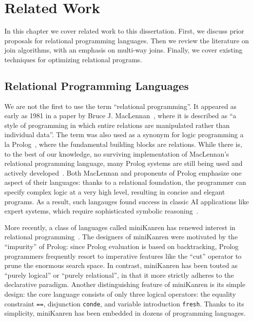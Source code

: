 \chapter{Related Work}
\label{chap:related}

In this chapter we cover related work to this dissertation.
First, we discuss prior proposals for relational programming languages.
Then we review the literature on join algorithms, with an emphasis on multi-way joins.
Finally, we cover existing techniques for optimizing relational programs.

\section{Relational Programming Languages}
\label{sec:related:relational}

We are not the first to use the term ``relational programming''.
It appeared as early as 1981 in a paper by Bruce J. MacLennan~\cite{maclennan1981introduction}, 
 where it is described as ``a style of programming in which entire relations 
 are manipulated rather than individual data''.
The term was also used as a synonym for logic programming a la Prolog~\cite{colmerauer1990introduction}, 
 where the fundamental building blocks are relations.
While there is, to the best of our knowledge, no surviving implementation of MacLennan's relational programming language, 
 many Prolog systems are still being used and actively 
 developed~\cite{zhou2012language, bueno1997ciao, diaz2001design, prolog2021scryer, wielemaker2012swi}.
Both MacLennan and proponents of Prolog emphasize one aspect of their languages: 
 thanks to a relational foundation, the programmer can specify 
 complex logic at a very high level, resulting in concise and elegant programs.
As a result, such langauges found success in classic AI applications
 like expert systems, which require sophisticated symbolic reasoning~\cite{korner2022fifty}.

More recently, a class of languages called miniKanren has renewed interest 
 in relational programming~\cite{byrd2009relational, byrd2012minikanren, rozplokhas2019certified, DBLP:books/daglib/0015651}.
The designers of miniKanren were motivated by the ``impurity'' of Prolog: 
 since Prolog evaluation is based on backtracking, 
 Prolog programmers frequently resort to imperative features like the ``cut'' operator 
 to prune the enormous search space.
In contrast, miniKanren has been touted as ``purely logical'' or ``purely relational'', 
 in that it more strictly adheres to the declarative paradigm.
Another distinguishing feature of miniKanren is its simple design: 
 the core language consists of only three logical operators: 
 the equality constraint \verb|==|, disjunction \verb|conde|, 
 and variable introduction \verb|fresh|.
Thanks to its simplicity, miniKanren has been embedded in dozens of programming languages. 

